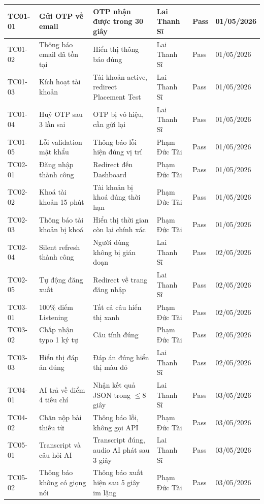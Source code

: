 \documentclass[a4paper,12pt]{extreport}
\begin{document}
\begin{longtable}{|p{1.3cm}|p{3.5cm}|p{3.5cm}|p{2.5cm}|p{1.5cm}|p{1.5cm}|}
    TC01-01 & Gửi OTP về email & OTP nhận được trong 30 giây & Lai Thanh Sĩ & Pass & 01/05/2026 \\ \hline
    TC01-02 & Thông báo email đã tồn tại & Hiển thị thông báo đúng & Lai Thanh Sĩ & Pass & 01/05/2026 \\ \hline
    TC01-03 & Kích hoạt tài khoản & Tài khoản active, redirect Placement Test & Lai Thanh Sĩ & Pass & 01/05/2026 \\ \hline
    TC01-04 & Huỷ OTP sau 3 lần sai & OTP bị vô hiệu, cần gửi lại & Lai Thanh Sĩ & Pass & 01/05/2026 \\ \hline
    TC01-05 & Lỗi validation mật khẩu & Thông báo lỗi hiện đúng vị trí & Phạm Đức Tài & Pass & 01/05/2026 \\ \hline
    TC02-01 & Đăng nhập thành công & Redirect đến Dashboard & Phạm Đức Tài & Pass & 01/05/2026 \\ \hline
    TC02-02 & Khoá tài khoản 15 phút & Tài khoản bị khoá đúng thời hạn & Phạm Đức Tài & Pass & 01/05/2026 \\ \hline
    TC02-03 & Thông báo tài khoản bị khoá & Hiển thị thời gian còn lại chính xác & Phạm Đức Tài & Pass & 01/05/2026 \\ \hline
    TC02-04 & Silent refresh thành công & Người dùng không bị gián đoạn & Lai Thanh Sĩ & Pass & 02/05/2026 \\ \hline
    TC02-05 & Tự động đăng xuất & Redirect về trang đăng nhập & Lai Thanh Sĩ & Pass & 02/05/2026 \\ \hline
    TC03-01 & 100\% điểm Listening & Tất cả câu hiển thị xanh & Phạm Đức Tài & Pass & 02/05/2026 \\ \hline
    TC03-02 & Chấp nhận typo 1 ký tự & Câu tính đúng & Phạm Đức Tài & Pass & 02/05/2026 \\ \hline
    TC03-03 & Hiển thị đáp án đúng & Đáp án đúng hiển thị màu đỏ & Lai Thanh Sĩ & Pass & 02/05/2026 \\ \hline
    TC04-01 & AI trả về điểm 4 tiêu chí & Nhận kết quả JSON trong $\leq$8 giây & Lai Thanh Sĩ & Pass & 03/05/2026 \\ \hline
    TC04-02 & Chặn nộp bài thiếu từ & Thông báo lỗi, không gọi API & Phạm Đức Tài & Pass & 03/05/2026 \\ \hline
    TC05-01 & Transcript và câu hỏi AI & Transcript đúng, audio AI phát sau 3 giây & Lai Thanh Sĩ & Pass & 03/05/2026 \\ \hline
    TC05-02 & Thông báo không có giọng nói & Thông báo xuất hiện sau 5 giây im lặng & Phạm Đức Tài & Pass & 03/05/2026 \\ \hline

\end{longtable}
\end{document}
